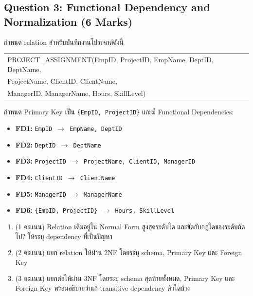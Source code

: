 \documentclass[a4paper,12pt]{article}
\begin{document}
\subsection*{Question 3: Functional Dependency and Normalization (6 Marks)}
กำหนด relation สำหรับบันทึกงานโปรเจกต์ดังนี้
\begin{center}
\small\ttfamily
\begin{tabular}{l}
PROJECT\_ASSIGNMENT(EmpID, ProjectID, EmpName, DeptID, DeptName,\\
\quad ProjectName, ClientID, ClientName,\\
\quad ManagerID, ManagerName, Hours, SkillLevel)
\end{tabular}
\end{center}
กำหนด Primary Key เป็น \texttt{\{EmpID, ProjectID\}} และมี Functional Dependencies:
\begin{itemize}
    \item \textbf{FD1:} \texttt{EmpID $\rightarrow$ EmpName, DeptID}
    \item \textbf{FD2:} \texttt{DeptID $\rightarrow$ DeptName}
    \item \textbf{FD3:} \texttt{ProjectID $\rightarrow$ ProjectName, ClientID, ManagerID}
    \item \textbf{FD4:} \texttt{ClientID $\rightarrow$ ClientName}
    \item \textbf{FD5:} \texttt{ManagerID $\rightarrow$ ManagerName}
    \item \textbf{FD6:} \texttt{\{EmpID, ProjectID\} $\rightarrow$ Hours, SkillLevel}
\end{itemize}

\begin{enumerate}[label=\textbf{3.\arabic*}]
    \item (1 คะแนน) Relation เดิมอยู่ใน Normal Form สูงสุดระดับใด และขัดกับกฎใดของระดับถัดไป? ให้ระบุ dependency ที่เป็นปัญหา
    \vspace{2.5cm}

    \item (2 คะแนน) แยก relation ให้ผ่าน 2NF โดยระบุ schema, Primary Key และ Foreign Key
    \vspace{4.0cm}

    \item (3 คะแนน) แยกต่อให้ผ่าน 3NF โดยระบุ schema สุดท้ายทั้งหมด, Primary Key และ Foreign Key พร้อมอธิบายว่าแก้ transitive dependency ตัวใดบ้าง
    \vspace{5.0cm}
\end{enumerate}

\newpage
\end{document}
